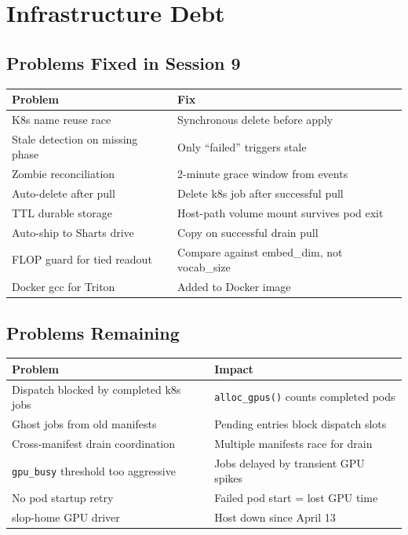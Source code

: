 \documentclass[11pt,a4paper]{report}
\begin{document}
\chapter{Infrastructure Debt}

\section{Problems Fixed in Session 9}

\begin{center}
\begin{tabular}{ll}
\toprule
Problem & Fix \\
\midrule
K8s name reuse race & Synchronous delete before apply \\
Stale detection on missing phase & Only ``failed'' triggers stale \\
Zombie reconciliation & 2-minute grace window from events \\
Auto-delete after pull & Delete k8s job after successful pull \\
TTL durable storage & Host-path volume mount survives pod exit \\
Auto-ship to Sharts drive & Copy on successful drain pull \\
FLOP guard for tied readout & Compare against embed\_dim, not vocab\_size \\
Docker gcc for Triton & Added to Docker image \\
\bottomrule
\end{tabular}
\end{center}

\section{Problems Remaining}

\begin{center}
\begin{tabular}{ll}
\toprule
Problem & Impact \\
\midrule
Dispatch blocked by completed k8s jobs & \texttt{alloc\_gpus()} counts completed pods \\
Ghost jobs from old manifests & Pending entries block dispatch slots \\
Cross-manifest drain coordination & Multiple manifests race for drain \\
\texttt{gpu\_busy} threshold too aggressive & Jobs delayed by transient GPU spikes \\
No pod startup retry & Failed pod start = lost GPU time \\
slop-home GPU driver & Host down since April 13 \\
\bottomrule
\end{tabular}
\end{center}
\end{document}
